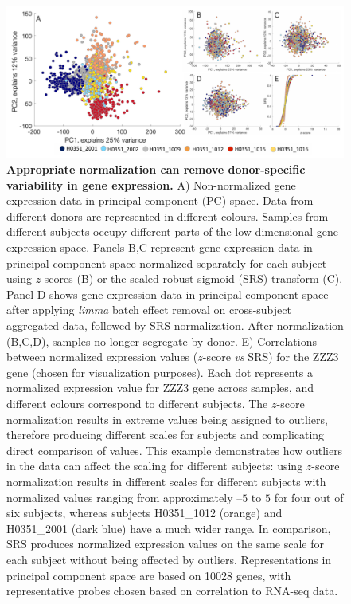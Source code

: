 \documentclass[10pt,A4]{article}
\begin{document}
\begin{figure}[h!]
  \centering
    \includegraphics[width=1\textwidth]{Ch4Fig6.pdf}
\caption{\textbf{Appropriate normalization can remove donor-specific variability in gene expression.}
A) Non-normalized gene expression data in principal component (PC) space. Data from different donors are represented in different colours. Samples from different subjects occupy different parts of the low-dimensional gene expression space. Panels B,C represent gene expression data in principal component space normalized separately for each subject using $z$-scores
(B) or the scaled robust sigmoid (SRS) transform (C). Panel D shows gene expression data in principal component space after applying \textit{limma} batch effect removal \citep{Ritchie2015} on cross-subject aggregated data, followed by SRS normalization. After normalization (B,C,D), samples no longer segregate by donor. E) Correlations between normalized expression values ($z$-score \textit{vs} SRS) for the ZZZ3 gene (chosen for visualization purposes).
Each dot represents a normalized expression value for ZZZ3 gene across samples, and different colours correspond to different subjects. The $z$-score normalization results in extreme values being assigned to outliers, therefore producing different scales for subjects and complicating direct comparison of values.
This example demonstrates how outliers in the data can affect the scaling for different subjects: using $z$-score normalization results in different scales for different subjects with normalized values ranging from approximately $–5$ to $5$ for four out of six subjects, whereas subjects H0351\_1012 (orange) and H0351\_2001 (dark blue) have a much wider range. In comparison, SRS produces normalized expression values on the same scale for each subject without being affected by outliers.
Representations in principal component space are based on \num{10028} genes, with representative probes chosen based on correlation to RNA-seq data. }
\label{fig:Ch4Fig6}
\end{figure}
\end{document}
